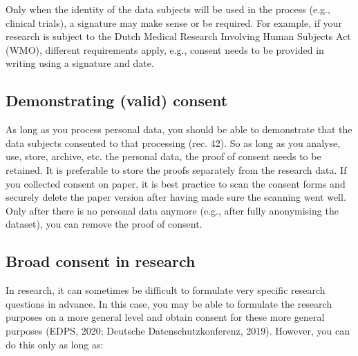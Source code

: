 \documentclass[
]{book}
\begin{document}
Only when the identity of the data subjects will be used in the process (e.g.,
clinical trials), a signature may make sense or be required. For example, if
your research is subject
to the Dutch Medical Research Involving Human Subjects Act (WMO),
different requirements apply,
e.g., consent needs to be provided in writing using a signature and date.

\hypertarget{demonstrate-consent}{%
\subsection{Demonstrating (valid) consent}\label{demonstrate-consent}}

As long as you process personal data, you should be able to demonstrate that the
data subjects consented to that processing
(rec. 42).
So as long as you analyse, use, store, archive, etc. the personal data, the
proof of consent needs to be retained. It is preferable to store the proofs
separately from the research data. If you collected consent on paper, it is
best practice to scan the consent forms and securely delete the paper version
after having made sure the scanning went well. Only after there is no personal
data anymore (e.g., after fully anonymising the dataset), you can remove the
proof of consent.

\hypertarget{broad-consent}{%
\subsection{Broad consent in research}\label{broad-consent}}

In research, it can sometimes be difficult to formulate very specific research
questions in advance. In this case, you may be able to formulate the research
purposes on a more general level and obtain consent for these more general
purposes
(EDPS, 2020;
Deutsche Datenschutzkonferenz, 2019).
However, you can do this only as long as:
\end{document}
